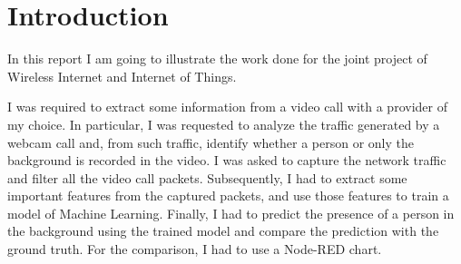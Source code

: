 \section{Introduction}
In this report I am going to illustrate the work done for the joint project of Wireless Internet and Internet of Things.

I was required to extract some information from a video call with a provider of my choice. In particular, I was requested to analyze the traffic generated by a webcam call and, from such traffic, identify whether a person or only the background is recorded in the video. I was asked to capture the network traffic and filter all the video call packets. Subsequently, I had to extract some important features from the captured packets, and use those features to train a model of Machine Learning. Finally, I had to predict the presence of a person in the background using the trained model and compare the prediction with the ground truth. For the comparison, I had to use a Node-RED chart.